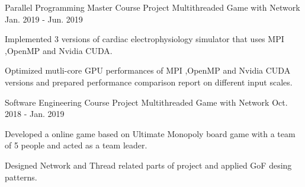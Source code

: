 
\begin{cventries}
  \cventry
   {Parallel Programming Master Course Project} %
    {Multithreaded Game with Network} %
    {} %
    {Jan. 2019 - Jun. 2019} %
    {
      \begin{cvitems} %
      	\item {Implemented 3 versions of cardiac electrophysiology simulator that uses MPI ,OpenMP and Nvidia CUDA.}
      	\item {Optimized mutli-core GPU performances of MPI ,OpenMP and Nvidia CUDA versions and prepared performance comparison report on different input scales.}
      \end{cvitems}
    }
  \cventry
   {Software Engineering Course Project} %
    {Multithreaded Game with Network} %
    {} %
    {Oct. 2018 - Jan. 2019} %
    {
      \begin{cvitems} %
      	\item {Developed a online game based on Ultimate Monopoly board game with a team of 5 people and acted as a team leader.} 
      	\item {Designed Network and Thread related parts of project and applied GoF desing patterns.} 
      \end{cvitems}
    }

\end{cventries}
